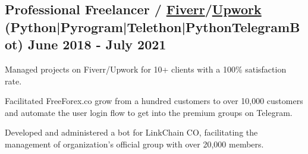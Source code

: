 \subsection{{Professional Freelancer / \href{https://www.fiverr.com/users/takausrazeem}{Fiverr}/\href{https://www.upwork.com/freelancers/~018bcc7acbf1d3e149}{Upwork} (Python|Pyrogram|Telethon|PythonTelegramBot) \hfill June 2018 - July 2021}}
\begin{zitemize}

\item Managed projects on Fiverr/Upwork for 10+ clients with a 100\% satisfaction rate.

\item Facilitated FreeForex.co grow from a hundred customers to over 10,000 customers and automate the user login flow to get into the premium groups on Telegram.

\item Developed and administered a bot for LinkChain CO, facilitating the management of organization's official group with over 20,000 members.

\end{zitemize}
